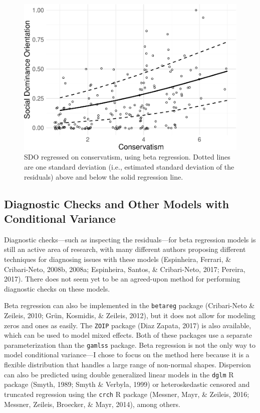 \documentclass[english,man]{apa6}
\newcounter{author}
\theoremstyle{definition}
\theoremstyle{definition}
\theoremstyle{remark}
\begin{document}
\begin{figure}
\centering
\includegraphics{beta_hurdle_files/figure-latex/unnamed-chunk-19-1.pdf}
\caption{\label{fig:unnamed-chunk-19}SDO regressed on conservatism, using
beta regression. Dotted lines are one standard deviation (i.e.,
estimated standard deviation of the residuals) above and below the solid
regression line.}
\end{figure}

\subsection{Diagnostic Checks and Other Models with Conditional
Variance}\label{diagnostic-checks-and-other-models-with-conditional-variance}

Diagnostic checks---such as inspecting the residuals---for beta
regression models is still an active area of research, with many
different authors proposing different techniques for diagnosing issues
with these models (Espinheira, Ferrari, \& Cribari-Neto, 2008b, 2008a;
Espinheira, Santos, \& Cribari-Neto, 2017; Pereira, 2017). There does
not seem yet to be an agreed-upon method for performing diagnostic
checks on these models.

Beta regression can also be implemented in the \texttt{betareg} package
(Cribari-Neto \& Zeileis, 2010; Grün, Kosmidis, \& Zeileis, 2012), but
it does not allow for modeling zeros and ones as easily. The
\texttt{ZOIP} package (Diaz Zapata, 2017) is also available, which can
be used to model mixed effects. Both of these packages use a separate
parameterization than the \texttt{gamlss} package. Beta regression is
not the only way to model conditional variance---I chose to focus on the
method here because it is a flexible distribution that handles a large
range of non-normal shapes. Dispersion can also be predicted using
double generalized linear models in the \texttt{dglm} R package (Smyth,
1989; Smyth \& Verbyla, 1999) or heteroskedastic censored and truncated
regression using the \texttt{crch} R package (Messner, Mayr, \& Zeileis,
2016; Messner, Zeileis, Broecker, \& Mayr, 2014), among others.
\end{document}
